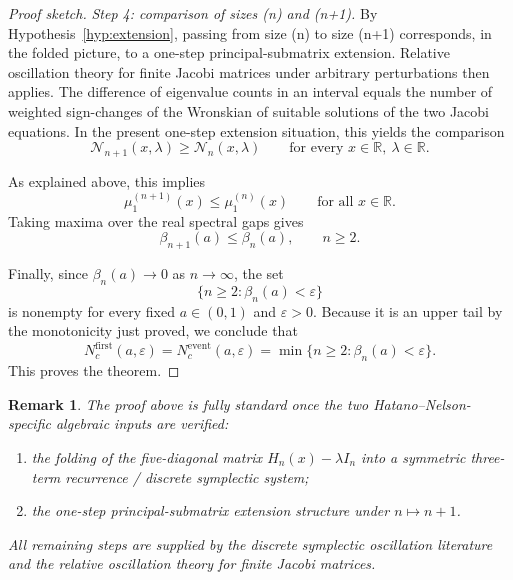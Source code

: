 \documentclass[11pt]{article}
\numberwithin{equation}{section}
\newtheorem{remark}[theorem]{Remark}
\begin{document}
\begin{proof}[Proof sketch]
\medskip
\noindent
\textit{Step 4: comparison of sizes (n) and (n+1).}
By Hypothesis~\ref{hyp:extension}, passing from size (n) to size (n+1) corresponds, in the
folded picture, to a one-step principal-submatrix extension. Relative oscillation theory for finite
Jacobi matrices under arbitrary perturbations then applies. The difference
of eigenvalue counts in an interval equals the number of weighted sign-changes of the Wronskian
of suitable solutions of the two Jacobi equations. In the present one-step
extension situation, this yields the comparison
\[
\mathcal N_{n+1}(x,\lambda)\ge \mathcal N_n(x,\lambda)
\qquad\text{for every }x\in\mathbb R,\ \lambda\in\mathbb R.
\]

As explained above, this implies
\[
\mu_1^{(n+1)}(x)\le \mu_1^{(n)}(x)
\qquad\text{for all }x\in\mathbb R.
\]
Taking maxima over the real spectral gaps gives
\[
\beta_{n+1}(a)\le \beta_n(a),
\qquad n\ge2.
\]

Finally, since \(\beta_n(a)\to0\) as \(n\to\infty\), the set
\[
\{n\ge2:\beta_n(a)<\varepsilon\}
\]
is nonempty for every fixed \(a\in(0,1)\) and \(\varepsilon>0\). Because it is an upper tail by
the monotonicity just proved, we conclude that
\[
N_c^{\mathrm{first}}(a,\varepsilon)
=
N_c^{\mathrm{event}}(a,\varepsilon)
=
\min\{n\ge2:\beta_n(a)<\varepsilon\}.
\]
This proves the theorem.
\end{proof}

\begin{remark}
The proof above is fully standard once the two Hatano--Nelson-specific algebraic inputs are
verified:

\begin{enumerate}
\item the folding of the five-diagonal matrix \(H_n(x)-\lambda I_n\) into a symmetric three-term
recurrence / discrete symplectic system;
\item the one-step principal-submatrix extension structure under \(n\mapsto n+1\).
\end{enumerate}

All remaining steps are supplied by the discrete symplectic oscillation literature and the relative
oscillation theory for finite Jacobi matrices.
\end{remark}
\end{document}
